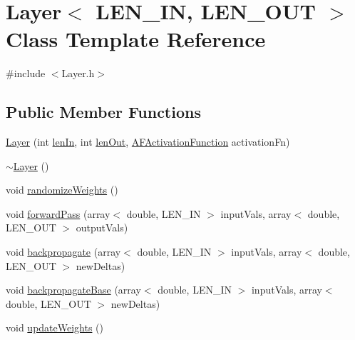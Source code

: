 \hypertarget{class_layer}{}\section{Layer$<$ L\+E\+N\+\_\+\+IN, L\+E\+N\+\_\+\+O\+UT $>$ Class Template Reference}
\label{class_layer}


{\ttfamily \#include $<$Layer.\+h$>$}

\subsection*{Public Member Functions}
\begin{DoxyCompactItemize}
\item 
\hyperlink{class_layer_a16f07312c7711257ffdefe9d3d51f8b2}{Layer} (int \hyperlink{class_layer_a844e22c542ae02cb475cabb8353300a8}{len\+In}, int \hyperlink{class_layer_ae10a61035ba7a18f9f2a6d1d3ebf9811}{len\+Out}, \hyperlink{class_a_f_activation_function}{A\+F\+Activation\+Function} activation\+Fn)
\item 
\hyperlink{class_layer_a3ed1ecdffa6a2bb492aa282f029e85ae}{$\sim$\+Layer} ()
\item 
void \hyperlink{class_layer_aee349ae2e2c54fa8079cc564e84cb938}{randomize\+Weights} ()
\item 
void \hyperlink{class_layer_adb74d1888a61fe0a0e13cebe9b300bb2}{forward\+Pass} (array$<$ double, L\+E\+N\+\_\+\+IN $>$ input\+Vals, array$<$ double, L\+E\+N\+\_\+\+O\+UT $>$ output\+Vals)
\item 
void \hyperlink{class_layer_a7f77b112096ae4aeeddc218f8c6aa707}{backpropagate} (array$<$ double, L\+E\+N\+\_\+\+IN $>$ input\+Vals, array$<$ double, L\+E\+N\+\_\+\+O\+UT $>$ new\+Deltas)
\item 
void \hyperlink{class_layer_a9eab88a84b81d25ba8327e94d5a61bd9}{backpropagate\+Base} (array$<$ double, L\+E\+N\+\_\+\+IN $>$ input\+Vals, array$<$ double, L\+E\+N\+\_\+\+O\+UT $>$ new\+Deltas)
\item 
void \hyperlink{class_layer_aa490ca327cae4e71d017d444c2c87468}{update\+Weights} ()
\end{DoxyCompactItemize}
